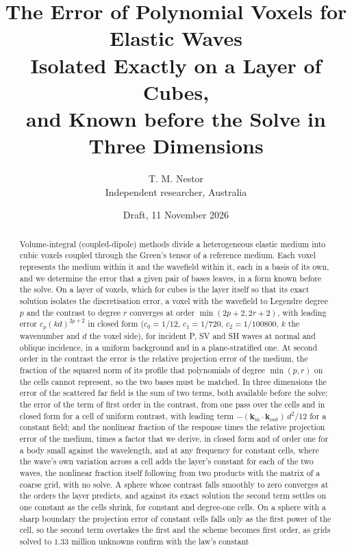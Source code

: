 \documentclass[11pt,a4paper]{article}
\title{\bfseries The Error of Polynomial Voxels for Elastic Waves\\[4pt]
\large Isolated Exactly on a Layer of Cubes,\\
and Known before the Solve in Three Dimensions}
\author{T. M. Nestor\\[2pt]\small Independent researcher, Australia}
\date{Draft, 11 November 2026}
\newcommand{\bk}{\mathbf{k}}
\begin{document}
\maketitle

\begin{abstract}
\noindent
Volume-integral (coupled-dipole) methods divide a heterogeneous elastic medium into cubic voxels coupled
through the Green's tensor of a reference medium. Each voxel represents the medium within it and the
wavefield within it, each in a basis of its own, and we determine the error that a given pair of bases
leaves, in a form known before the solve. On a layer of voxels, which for cubes is the layer itself so
that its exact solution isolates the discretisation error, a voxel with the wavefield to Legendre degree
$p$ and the contrast to degree $r$ converges at order $\min(2p+2,2r+2)$, with leading error
$c_p(kd)^{2p+2}$ in closed form ($c_0=1/12$, $c_1=1/720$, $c_2=1/100800$, $k$ the wavenumber and $d$ the
voxel side), for incident P, SV and SH waves at normal and oblique incidence, in a uniform background and
in a plane-stratified one. At second order in the contrast the error is the relative projection error of
the medium, the fraction of the squared norm of its profile that polynomials of degree $\min(p,r)$ on the
cells cannot represent, so the two bases must be matched. In three dimensions the error of the scattered
far field is the sum of two terms, both available before the solve: the error of the term of first order
in the contrast, from one pass over the cells and in closed form for a cell of uniform contrast, with
leading term $-(\bk_{\mathrm{in}}\cdot\bk_{\mathrm{out}})\,d^2/12$ for a constant field; and the nonlinear
fraction of the response times the relative projection error of the medium, times a factor that we derive,
in closed form and of order one for a body small against the wavelength, and at any frequency for constant
cells, where the wave's own variation across a cell adds the layer's constant for each of the two waves,
the nonlinear fraction itself following from two products with the matrix
of a coarse grid, with no solve. A sphere whose contrast falls smoothly to zero converges at the orders
the layer predicts, and against its exact solution the second term settles on one constant as the cells
shrink, for constant and degree-one cells. On a sphere with a sharp boundary the projection error of
constant cells falls only as the first power of the cell, so the second term overtakes the first and the
scheme becomes first order, as grids solved to $1.33$ million unknowns confirm with the law's constant

\end{abstract}
\end{document}
